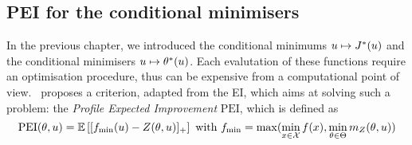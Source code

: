 \documentclass[../../Main_ManuscritThese.tex]{subfiles}
\begin{document}




\subsection{PEI for the conditional minimisers}
\label{sec:PEI_criterion}
In the previous chapter, we introduced the conditional minimums
$u\mapsto J^*(u)$ and the conditional minimisers
$u \mapsto \theta^*(u)$. Each evalutation of these functions require
an optimisation procedure, thus can be expensive from a computational
point of view.~\cite{ginsbourger_bayesian_2014} proposes a criterion,
adapted from the EI, which aims at solving such a problem: the
\emph{Profile Expected Improvement} $\mathrm{PEI}$, which is defined
as
\begin{equation}
  \label{eq:def_PEI}
  \mathrm{PEI}(\theta, u)= \mathbb{E}\left[[f_{\min}(u) - Z(\theta, u)]_+\right] \text{ with } f_{\min} = \max(\min_{x\in\mathcal{X}} f(x), \min_{\theta \in \Theta} m_Z(\theta, u))
\end{equation}
\end{document}
